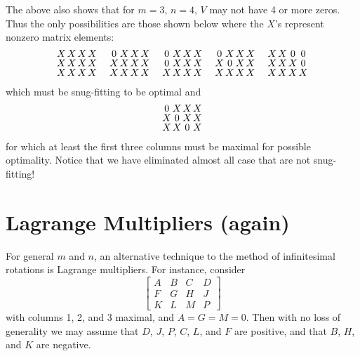 The above also shows that for $m = 3$, $n = 4$, $V$ may not have 4 or more
zeros.  Thus the only possibilities are those shown below where the $X$'s
\label{refpage23}
represent nonzero matrix elements:
\begin{equation*}
\myarrset
\begin{array}{cccccccccccccccccccccccc}
X & X & X & X & ~~~ & 0 & X & X & X & ~~~ & 0 & X & X & X & ~~~ & 0 & X & X & X & ~~~ & X & X & 0 & 0 \\
X & X & X & X & ~~~ & X & X & X & X & ~~~ & 0 & X & X & X & ~~~ & X & 0 & X & X & ~~~ & X & X & X & 0 \\
X & X & X & X & ~~~ & X & X & X & X & ~~~ & X & X & X & X & ~~~ & X & X & X & X & ~~~ & X & X & X & X
\end{array}
\end{equation*}
which must be snug-fitting to be optimal and
\begin{equation*}
\myarrset
\begin{array}{cccc}
0 & X & X & X \\
X & 0 & X & X \\
X & X & 0 & X
\end{array}
\end{equation*}
for which at least the first three columns must be maximal for possible
optimality.  Notice that we have eliminated almost all case that are not
snug-fitting!

\section*{Lagrange Multipliers (again)}

For general $m$ and $n$, an alternative technique to the method of
infinitesimal rotations is Lagrange multipliers.  For instance, consider
\begin{equation*}
\begin{bmatrix}
A & B & C & D \\
F & G & H & J \\
K & L & M & P
\end{bmatrix}
\end{equation*}
with columns 1, 2, and 3 maximal, and $A = G = M = 0$.  Then with no loss of
generality we may assume that $D$, $J$, $P$, $C$, $L$, and $F$ are positive,
and that $B$, $H$, and $K$ are negative.

